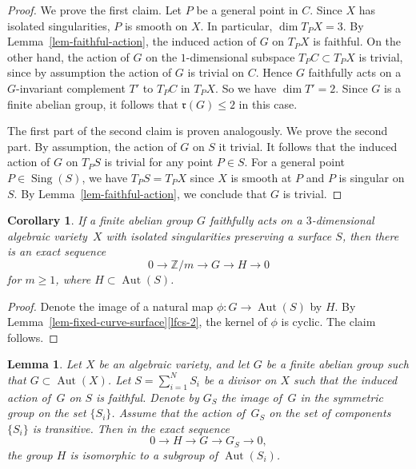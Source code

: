 \documentclass[11pt]{amsart}
\numberwithin{equation}{section}
\newtheorem{corollary}[thm]{Corollary}
\newtheorem{lem}[thm]{Lemma}
\theoremstyle{definition}
\theoremstyle{remark}
\newcommand{\lra}{\longrightarrow}
\DeclareMathOperator{\Aut}{Aut}
\DeclareMathOperator{\Sing}{Sing}
\begin{document}
\begin{proof}
We prove the first claim. Let $P$ be a general point in $C$. Since $X$ has isolated singularities, $P$ is smooth on $X$. In particular, $\dim T_{P}X=3$. By Lemma~\ref{lem-faithful-action}, the induced action of $G$ on $T_{P}X$ is faithful. On the other hand, the action of $G$ on the $1$-dimensional subspace $T_P C \subset T_{P}X$ is trivial, since by assumption the action of $G$ is trivial on $C$. Hence $G$ faithfully acts on a $G$-invariant complement $T'$ to $T_P C$ in $T_P X$. So we have $\dim T'=2$. Since $G$ is a finite abelian group, it follows that $\mathfrak{r}(G)\leq 2$ in this case.  

The first part of the second claim is proven analogously. We prove the second part.  By assumption, the action of $G$ on $S$ it trivial. It follows that the induced action of $G$ on $T_P S$ is trivial for any point $P\in S$. For a general point $P\in \Sing(S)$, we have $T_P S=T_P X$ since $X$ is smooth at $P$ and $P$ is singular on $S$. By Lemma~\ref{lem-faithful-action}, we conclude that $G$ is trivial.
\end{proof}

\begin{corollary}
\label{cor-G-preserves-K3-type}
If a finite abelian group $G$ faithfully acts on a $3$-dimensional algebraic variety~$X$ with isolated singularities preserving a surface $S$, then there is an exact sequence
\[
0\lra \mathbb{Z}/m \lra G \lra H \lra 0
\]
for $m\geq 1$, where $H\subset \Aut(S)$. 
\end{corollary}

\begin{proof}
Denote the image of a natural map $\phi\colon G\to \Aut(S)$ by $H$. By Lemma~\ref{lem-fixed-curve-surface}\eqref{lfcs-2}, the kernel of $\phi$ is cyclic. The claim follows. 
\end{proof}


\begin{lem}
\label{lem-diagonal-in-product}
Let $X$ be an algebraic variety, and let $G$ be a finite abelian group such that $G\subset \Aut(X)$.  Let $S=\sum_{i=1}^N S_i$ be a divisor on $X$ such that the induced action of\, $G$ on $S$ is faithful.  Denote by $G_S$ the image of\, $G$ in the symmetric group on the set $\{S_i\}$.  Assume that the action of\, $G_S$ on the set of components $\{S_i\}$ is transitive.  Then in the exact sequence
\begin{equation}
\label{eq-action-on-a-surface}
0\lra H\lra G\lra G_S\lra 0,
\end{equation}
the group $H$ is isomorphic to a subgroup of $\Aut(S_i)$.
\end{lem}
\end{document}
